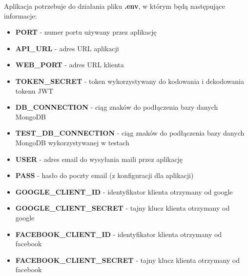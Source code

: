 \documentclass{article}
\begin{document}
            Aplikacja potrzebuje do działania pliku \textbf{.env}, w którym będą następujące informacje:
            \begin{itemize}
                \item \textbf{PORT} - numer portu używany przez aplikację
                \item \textbf{API\_URL} - adres URL aplikacji
                \item \textbf{WEB\_PORT} - adres URL klienta
                \item \textbf{TOKEN\_SECRET} - token wykorzystywany do kodowania i dekodowania tokenu JWT
                \item \textbf{DB\_CONNECTION} - ciąg znaków do podłączenia bazy danych MongoDB
                \item \textbf{TEST\_DB\_CONNECTION} - ciąg znaków do podłączenia bazy danych MongoDB wykorzystywanej w testach
                \item \textbf{USER} - adres email do wysyłania maili przez aplikację
                \item \textbf{PASS} - hasło do poczty email (z konfiguracji dla aplikacji)
                \item \textbf{GOOGLE\_CLIENT\_ID} - identyfikator klienta otrzymany od google
                \item \textbf{GOOGLE\_CLIENT\_SECRET} - tajny klucz klienta otrzymany od google
                \item \textbf{FACEBOOK\_CLIENT\_ID} - identyfikator klienta otrzymany od facebook
                \item \textbf{FACEBOOK\_CLIENT\_SECRET} - tajny klucz klienta otrzymany od facebook
            \end{itemize}
\end{document}
